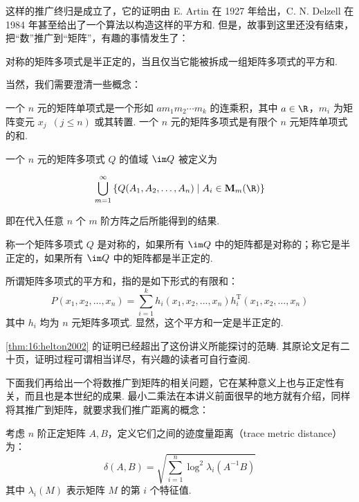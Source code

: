 这样的推广终归是成立了，它的证明由 E. Artin 在 1927 年给出，C. N. Delzell 在 1984 年甚至给出了一个算法以构造这样的平方和. 但是，故事到这里还没有结束，把``数''推广到``矩阵''，有趣的事情发生了：

\begin{theorem}[Helton, 2002]\label{thm:16:helton2002}
    对称的矩阵多项式是半正定的，当且仅当它能被拆成一组矩阵多项式的平方和.
\end{theorem}

当然，我们需要澄清一些概念：

\begin{definition}
    一个 $n$ 元的矩阵单项式是一个形如 $am_1m_2 \cdots m_k$ 的连乘积，其中 $a \in \R$，$m_i$ 为矩阵变元 $x_j \enspace(j \leqslant n)$ 或其转置. 一个 $n$ 元的矩阵多项式是有限个 $n$ 元矩阵单项式的和.
\end{definition}

\begin{definition}
    一个 $n$ 元的矩阵多项式 $Q$ 的值域 $\im Q$ 被定义为

    \[
    \bigcup_{m = 1}^\infty\left\{Q(A_1, A_2, \ldots, A_n) \mid A_i \in \mathbf{M}_m(\R)\right\}
    \]

    即在代入任意 $n$ 个 $m$ 阶方阵之后所能得到的结果.
\end{definition}

\begin{definition}
    称一个矩阵多项式 $Q$ 是对称的，如果所有 $\im Q$ 中的矩阵都是对称的；称它是半正定的，如果所有 $\im Q$ 中的矩阵都是半正定的.
\end{definition}

\begin{definition}
    所谓矩阵多项式的平方和，指的是如下形式的有限和：
    \[
    P(x_1, x_2, \ldots, x_n) = \sum_{i = 1}^k h_i(x_1, x_2, \ldots, x_n)h_i^\mathrm{T}(x_1, x_2, \ldots, x_n)
    \]
    其中 $h_i$ 均为 $n$ 元矩阵多项式. 显然，这个平方和一定是半正定的.
\end{definition}

\autoref{thm:16:helton2002} 的证明已经超出了这份讲义所能探讨的范畴. 其原论文足有二十页，证明过程可谓相当详尽，有兴趣的读者可自行查阅.

下面我们再给出一个将数推广到矩阵的相关问题，它在某种意义上也与正定性有关，而且也是本世纪的成果. 最小二乘法在本讲义前面很早的地方就有介绍，同样将其推广到矩阵，就要求我们推广距离的概念：

\begin{definition}
    考虑 $n$ 阶正定矩阵 $A, B$，定义它们之间的迹度量距离（trace metric distance）为：
    \[
    \delta(A, B) = \sqrt{\sum_{i = 1}^n \log^2\lambda_i(A^{-1}B)}
    \]
    其中 $\lambda_i(M)$ 表示矩阵 $M$ 的第 $i$ 个特征值.
\end{definition}

